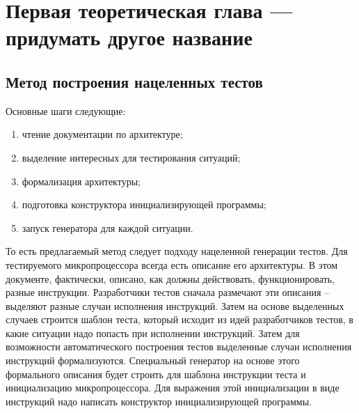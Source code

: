 \chapter{Первая теоретическая глава --- придумать другое название}

\section{Метод построения нацеленных тестов}
Основные шаги следующие:
\begin{enumerate}
  \item чтение документации по архитектуре;
  \item выделение интересных для тестирования ситуаций;
  \item формализация архитектуры;
  \item подготовка конструктора инициализирующей программы;
  \item запуск генератора для каждой ситуации.
\end{enumerate}

То есть предлагаемый метод следует подходу нацеленной генерации тестов. Для
тестируемого микропроцессора всегда есть описание его архитектуры. В этом
документе, фактически, описано, как должны действовать, функционировать, разные
инструкции. Разработчики тестов сначала размечают эти описания -- выделяют
разные случаи исполнения инструкций. Затем на основе выделенных случаев строится
шаблон теста, который исходит из идей разработчиков тестов, в какие ситуации
надо попасть при исполнении инструкций. Затем для возможности автоматического
построения тестов выделенные случаи исполнения инструкций формализуются.
Специальный генератор на основе этого формального описания будет строить для
шаблона инструкции теста и инициализацию микропроцессора.
Для выражения этой инициализации в виде инструкций надо написать конструктор
инициализирующей программы.

